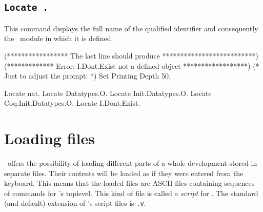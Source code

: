 

\subsection{\tt Locate {\qualid}.}
This command displays the full name of the qualified identifier {\qualid}
and consequently the \Coq\ module in which it is defined.

\begin{coq_eval}
(***************** The last line should produce **************************)
(************* Error: I.Dont.Exist not a defined object ******************)
(* Just to adjust the prompt: *) Set Printing Depth 50.
\end{coq_eval}
\begin{coq_example}
Locate nat.
Locate Datatypes.O.
Locate Init.Datatypes.O.
Locate Coq.Init.Datatypes.O.
Locate I.Dont.Exist.
\end{coq_example}

\section{Loading files}

\Coq\ offers the possibility of loading different
parts of a whole development stored in separate files. Their contents
will be loaded as if they were entered from the keyboard. This means
that the loaded files are ASCII files containing sequences of commands
for \Coq's toplevel. This kind of file is called a {\em script} for
\Coq{}. The standard (and default) extension of
\Coq's script files is {\tt .v}.


